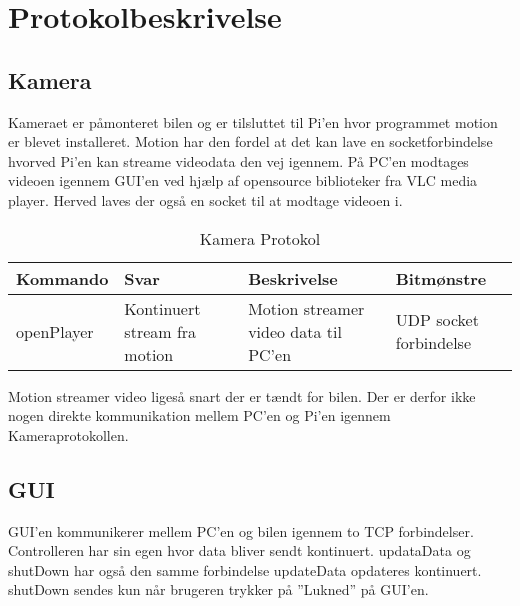 \section{Protokolbeskrivelse}

\subsection{Kamera}

Kameraet er påmonteret bilen og er tilsluttet til Pi'en hvor programmet motion er blevet installeret. Motion har den fordel at det kan lave en socketforbindelse hvorved Pi’en kan streame videodata den vej igennem. På PC'en modtages videoen igennem GUI'en ved hjælp af opensource biblioteker fra VLC media player. Herved laves der også en socket til at modtage videoen i.

\begin{table}[h]
\begin{tabularx}{\textwidth}{| Z | Z | Z | Z |} \hline

\textbf{Kommando} 						&
\textbf{Svar}							&
\textbf{Beskrivelse}					&
\textbf{Bitmønstre}						\\ \hline

openPlayer								&
Kontinuert stream fra motion			&
Motion streamer video data til PC'en	&
UDP socket forbindelse					\\ \hline

\end{tabularx}
\caption{Kamera Protokol}
\label{tbl:prt_cam}
\end{table}

Motion streamer video ligeså snart der er tændt for bilen. Der er derfor ikke nogen direkte kommunikation mellem PC'en og Pi'en igennem Kameraprotokollen.


\subsection{GUI}

GUI'en kommunikerer mellem PC'en og bilen igennem to TCP forbindelser. Controlleren har sin egen hvor data bliver sendt kontinuert. updataData og shutDown har også den samme forbindelse updateData opdateres kontinuert. shutDown sendes kun når brugeren trykker på ''Lukned'' på GUI'en. 

